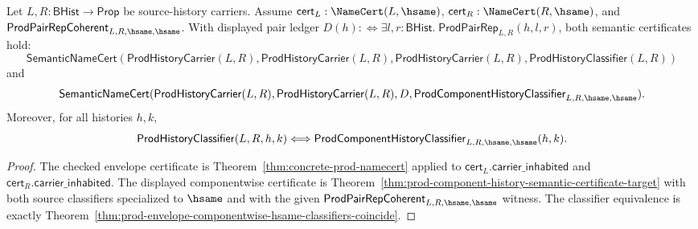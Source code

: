 \begin{theorem}
\label{thm:prod-hsame-componentwise-certificate-envelope-equivalent}
Let $L,R:\mathsf{BHist}\to\mathsf{Prop}$ be source-history carriers. Assume
$\mathsf{cert}_L:\NameCert(L,\hsame)$,
$\mathsf{cert}_R:\NameCert(R,\hsame)$, and
$\mathsf{ProdPairRepCoherent}_{L,R,\hsame,\hsame}$. With displayed pair ledger
$D(h):\Longleftrightarrow
\exists l,r:\mathsf{BHist}.\;\mathsf{ProdPairRep}_{L,R}(h,l,r)$, both
semantic certificates hold:
$$
\mathsf{SemanticNameCert}(\mathsf{ProdHistoryCarrier}(L,R),
\mathsf{ProdHistoryCarrier}(L,R),
\mathsf{ProdHistoryCarrier}(L,R),
\mathsf{ProdHistoryClassifier}(L,R))
$$
and
$$
\mathsf{SemanticNameCert}(\mathsf{ProdHistoryCarrier}(L,R),
\mathsf{ProdHistoryCarrier}(L,R),
D,
\mathsf{ProdComponentHistoryClassifier}_{L,R,\hsame,\hsame}).
$$
Moreover, for all histories $h,k$,
$$
\mathsf{ProdHistoryClassifier}(L,R,h,k)
\Longleftrightarrow
\mathsf{ProdComponentHistoryClassifier}_{L,R,\hsame,\hsame}(h,k).
$$
\end{theorem}
\begin{proof}
The checked envelope certificate is Theorem~\ref{thm:concrete-prod-namecert}
applied to $\mathsf{cert}_L.\mathsf{carrier\_inhabited}$ and
$\mathsf{cert}_R.\mathsf{carrier\_inhabited}$. The displayed componentwise
certificate is Theorem~\ref{thm:prod-component-history-semantic-certificate-target}
with both source classifiers specialized to $\hsame$ and with the given
$\mathsf{ProdPairRepCoherent}_{L,R,\hsame,\hsame}$ witness. The classifier
equivalence is exactly
Theorem~\ref{thm:prod-envelope-componentwise-hsame-classifiers-coincide}.
\end{proof}

